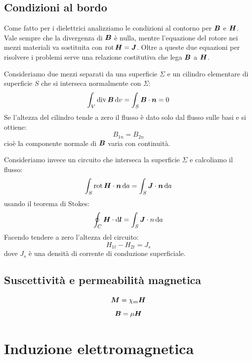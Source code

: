 \section{Condizioni al bordo}
Come fatto per i dielettrici analizziamo le condizioni al contorno per $\boldsymbol{B}$ e $\boldsymbol{H}$. Vale sempre che la divergenza di $\boldsymbol{B}$ è nulla, mentre l'equazione del rotore nei mezzi materiali va sostituita con $\operatorname{rot}\boldsymbol{H}=\boldsymbol{J}$. Oltre a queste due equazioni per risolvere i problemi serve una relazione costitutiva che lega $\boldsymbol{B}$ a $\boldsymbol{H}$.

Consideriamo due mezzi separati da una superficie $\Sigma$ e un cilindro elementare di superficie $S$ che si interseca normalmente con $\Sigma$:
\begin{equation}
  \int_V \operatorname{div} \boldsymbol{B}\,\mathrm{d} v = \int_S\boldsymbol{B}\cdot\boldsymbol{n} = 0
\end{equation}
Se l'altezza del cilindro tende a zero il flusso è dato solo dal flusso sulle basi e si ottiene:
\begin{equation}
  B_{1n}=B_{2n}
\end{equation}
cioè la componente normale di $\boldsymbol{B}$ varia con continuità.

Consideriamo invece un circuito che interseca la superficie $\Sigma$ e calcoliamo il flusso:
\begin{equation}
  \int_S\operatorname{rot}\boldsymbol{H}\cdot\boldsymbol{n}\,\mathrm{d} a=\int_S\boldsymbol{J}\cdot\boldsymbol{n}\,\mathrm{d} a
\end{equation}
usando il teorema di Stokes:
\begin{equation}
  \oint_C\boldsymbol{H}\cdot\mathrm{d}\boldsymbol{l}=\int_S\boldsymbol{J}\cdot n\,\mathrm{d} a
\end{equation}
Facendo tendere a zero l'altezza del circuito:
\begin{equation}
  H_{1t}-H_{2t}=J_s
\end{equation}
dove $J_s$ è una densità di corrente di conduzione superficiale.

\section{Suscettività e permeabilità magnetica}
\begin{equation}
  \boldsymbol{M} = \chi_m\boldsymbol{H}
\end{equation}
\begin{equation}
  \boldsymbol{B} = \mu\boldsymbol{H}
\end{equation}




\chapter{Induzione elettromagnetica}
\minitoc

